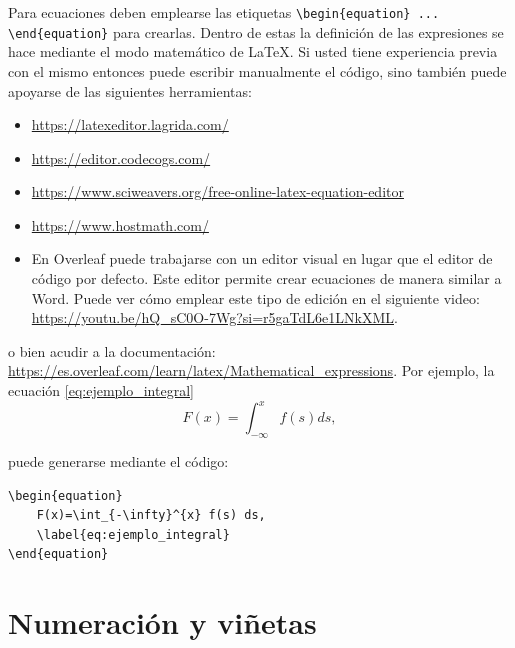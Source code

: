 Para ecuaciones deben emplearse las etiquetas \verb|\begin{equation} ... \end{equation}| para crearlas. Dentro de estas la definición de las expresiones se hace mediante el modo matemático de \LaTeX. Si usted tiene experiencia previa con el mismo entonces puede escribir manualmente el código, sino también puede apoyarse de las siguientes herramientas:

\begin{itemize}
    \itemsep 0em

    \item \href{https://latexeditor.lagrida.com/}{https://latexeditor.lagrida.com/}

    \item \href{https://editor.codecogs.com/}{https://editor.codecogs.com/}

    \item \href{https://www.sciweavers.org/free-online-latex-equation-editor}{https://www.sciweavers.org/free-online-latex-equation-editor}

    \item \href{https://www.hostmath.com/}{https://www.hostmath.com/}

    \item En Overleaf puede trabajarse con un editor visual en lugar que el editor de código por defecto. Este editor permite crear ecuaciones de manera similar a Word. Puede ver cómo emplear este tipo de edición en el siguiente video: \href{https://youtu.be/hQ_sC0O-7Wg?si=r5gaTdL6e1LNkXML}{https://youtu.be/hQ\_sC0O-7Wg?si=r5gaTdL6e1LNkXML}.
\end{itemize}

o bien acudir a la documentación: \href{https://es.overleaf.com/learn/latex/Mathematical_expressions}{https://es.overleaf.com/learn/latex/Mathematical\_expressions}. Por ejemplo, la ecuación \eqref{eq:ejemplo_integral}
\begin{equation}
    F(x)=\int_{-\infty}^{x} f(s) ds,
    \label{eq:ejemplo_integral}
\end{equation}

puede generarse mediante el código:
\begin{verbatim}
\begin{equation}
    F(x)=\int_{-\infty}^{x} f(s) ds,
    \label{eq:ejemplo_integral}
\end{equation} 
\end{verbatim}


\section{Numeración y viñetas}

